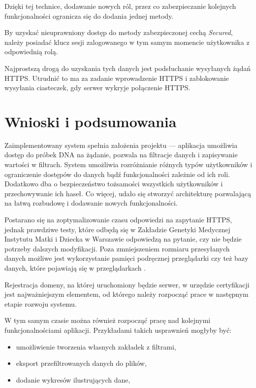 \documentclass[a4paper,12pt,twoside]{article}
\begin{document}
Dzięki tej technice, dodawanie nowych ról, przez co zabezpieczanie
kolejnych funkcjonalności ogranicza się do dodania jednej metody.

By uzyskać nieuprawniony dostęp do metody zabezpieczonej cechą \textit{Secured},
należy posiadać klucz sesji zalogowanego w tym samym momencie użytkownika
z odpowiednią rolą.

Najprostszą drogą do uzyskania tych danych jest podsłuchanie wysyłanych
żądań HTTPS. Utrudnić to ma za zadanie wprowadzenie HTTPS i zablokowanie wysyłania
ciasteczek, gdy serwer wykryje połączenie HTTPS.

\newpage
\section{Wnioski i podsumowania}

Zaimplementowany system spełnia założenia projektu — aplikacja
umożliwia dostęp do próbek DNA na żądanie, pozwala na filtracje danych
i zapisywanie wartości w filtrach.
System umożliwia rozróżnianie różnych typów użytkowników
i ograniczenie dostępów do danych bądź funkcjonalności zależnie od ich
roli.
Dodatkowo dba o bezpieczeństwo
tożsamości wszystkich użytkowników i przechowywanie ich haseł.
Co więcej, udało się stworzyć
architekturę pozwalającą na łatwą rozbudowę
i dodawanie nowych funkcjonalności.

Postarano się na zoptymalizowanie czasu odpowiedzi na zapytanie HTTPS,
jednak prawdziwe testy, które odbędą się w Zakładzie Genetyki Medycznej Instytutu Matki i Dziecka w Warszawie odpowiedzą na pytanie, czy
nie będzie potrzeby dalszych modyfikacji. Poza zmniejszeniem
rozmiaru przesyłanych danych możliwe jest wykorzystanie pamięci podręcznej
przeglądarki czy też bazy danych, które pojawiają się w przeglądarkach \cite{w3cDatabase}.

Rejestracja domeny, na której uruchomiony będzie serwer,
w urzędzie certyfikacji jest najważniejszym elementem,
od którego należy rozpocząć prace w następnym etapie rozwoju systemu.

W tym samym czasie można również rozpocząć pracę nad kolejnymi funkcjonalnościami
aplikacji. Przykładami takich usprawnień mogłyby być:
\begin{itemize}
\item umożliwienie tworzenia własnych zakładek z filtrami,
\item eksport przefiltrowanych danych do plików,
\item dodanie wykresów ilustrujących dane,
\end{itemize}
\end{document}
